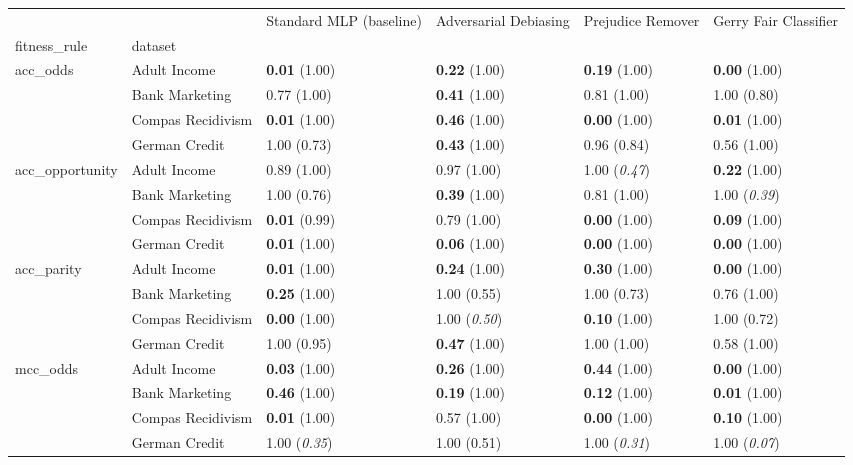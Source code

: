 \begin{tabular}{llllll}
\toprule
 &  & Standard MLP (baseline) & Adversarial Debiasing & Prejudice Remover & Gerry Fair Classifier \\
fitness_rule & dataset &  &  &  &  \\
\midrule
\multirow[t]{4}{*}{acc_odds} & Adult Income & \textbf{0.01} (1.00) & \textbf{0.22} (1.00) & \textbf{0.19} (1.00) & \textbf{0.00} (1.00) \\
 & Bank Marketing & 0.77 (1.00) & \textbf{0.41} (1.00) & 0.81 (1.00) & 1.00 (0.80) \\
 & Compas Recidivism & \textbf{0.01} (1.00) & \textbf{0.46} (1.00) & \textbf{0.00} (1.00) & \textbf{0.01} (1.00) \\
 & German Credit & 1.00 (0.73) & \textbf{0.43} (1.00) & 0.96 (0.84) & 0.56 (1.00) \\
\cline{1-6}
\multirow[t]{4}{*}{acc_opportunity} & Adult Income & 0.89 (1.00) & 0.97 (1.00) & 1.00 (\textit{0.47}) & \textbf{0.22} (1.00) \\
 & Bank Marketing & 1.00 (0.76) & \textbf{0.39} (1.00) & 0.81 (1.00) & 1.00 (\textit{0.39}) \\
 & Compas Recidivism & \textbf{0.01} (0.99) & 0.79 (1.00) & \textbf{0.00} (1.00) & \textbf{0.09} (1.00) \\
 & German Credit & \textbf{0.01} (1.00) & \textbf{0.06} (1.00) & \textbf{0.00} (1.00) & \textbf{0.00} (1.00) \\
\cline{1-6}
\multirow[t]{4}{*}{acc_parity} & Adult Income & \textbf{0.01} (1.00) & \textbf{0.24} (1.00) & \textbf{0.30} (1.00) & \textbf{0.00} (1.00) \\
 & Bank Marketing & \textbf{0.25} (1.00) & 1.00 (0.55) & 1.00 (0.73) & 0.76 (1.00) \\
 & Compas Recidivism & \textbf{0.00} (1.00) & 1.00 (\textit{0.50}) & \textbf{0.10} (1.00) & 1.00 (0.72) \\
 & German Credit & 1.00 (0.95) & \textbf{0.47} (1.00) & 1.00 (1.00) & 0.58 (1.00) \\
\cline{1-6}
\multirow[t]{4}{*}{mcc_odds} & Adult Income & \textbf{0.03} (1.00) & \textbf{0.26} (1.00) & \textbf{0.44} (1.00) & \textbf{0.00} (1.00) \\
 & Bank Marketing & \textbf{0.46} (1.00) & \textbf{0.19} (1.00) & \textbf{0.12} (1.00) & \textbf{0.01} (1.00) \\
 & Compas Recidivism & \textbf{0.01} (1.00) & 0.57 (1.00) & \textbf{0.00} (1.00) & \textbf{0.10} (1.00) \\
 & German Credit & 1.00 (\textit{0.35}) & 1.00 (0.51) & 1.00 (\textit{0.31}) & 1.00 (\textit{0.07}) \\

\end{tabular}
